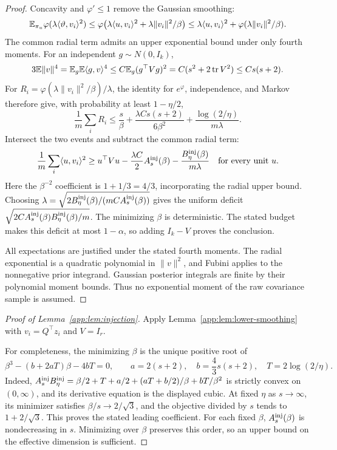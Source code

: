 \documentclass[11pt,a4paper]{article}
\theoremstyle{definition}\newtheorem{definition}[theorem]{Definition}
\theoremstyle{remark}\newtheorem{remark}[theorem]{Remark}
\numberwithin{equation}{section}
\newcommand{\norm}[1]{\lVert#1\rVert}\newcommand{\ip}[2]{\langle#1,#2\rangle}
\DeclareMathOperator{\tr}{tr}\DeclareMathOperator{\rank}{rank}
\begin{document}
\begin{proof}
Concavity and $\varphi'\le1$ remove the Gaussian smoothing:
\[
 \E_{\pi_u}\varphi(\lambda\ip\vartheta{v_i}^2)
 \le\varphi\!\left(\lambda\ip u{v_i}^2+
                       \lambda\norm{v_i}^2/\beta\right)
 \le\lambda\ip u{v_i}^2+
                       \varphi(\lambda\norm{v_i}^2/\beta).
\]
The common radial term admits an upper exponential bound under only
fourth moments. For an independent $g\sim N(0,I_k)$,
\[
 3\E\norm v^4=\E_g\E\ip gv^4
 \le C\E_g(g^\top Vg)^2
 =C(s^2+2\tr V^2)\le Cs(s+2).
\]
For $R_i=\varphi(\lambda\norm{v_i}^2/\beta)/\lambda$, the identity for
$e^\varphi$, independence, and Markov therefore give, with probability
at least $1-\eta/2$,
\[
 \frac1m\sum_iR_i
 \le\frac s\beta+\frac{\lambda C s(s+2)}{6\beta^2}
                          +\frac{\log(2/\eta)}{m\lambda}.
\]
Intersect the two events and subtract the common radial term:
\[
 \frac1m\sum_i\ip u{v_i}^2
 \ge u^\top Vu-\frac{\lambda C}{2}A_s^{\rm inj}(\beta)
                  -\frac{B_\eta^{\rm inj}(\beta)}{m\lambda}
 \quad\text{for every unit }u.
\]
Here the $\beta^{-2}$ coefficient is $1+1/3=4/3$, incorporating the
radial upper bound. Choosing
$\lambda=\sqrt{2B_\eta^{\rm inj}(\beta)/(mCA_s^{\rm inj}(\beta))}$ gives the uniform
deficit $\sqrt{2CA_s^{\rm inj}(\beta)B_\eta^{\rm inj}(\beta)/m}$.
The minimizing $\beta$ is deterministic. The stated budget makes this
deficit at most $1-\alpha$, so adding $I_k-V$ proves the conclusion.

All expectations are justified under the stated fourth moments.
The radial exponential is a quadratic polynomial in $\norm v^2$,
and Fubini applies to the nonnegative prior integrand. Gaussian posterior
integrals are finite by their polynomial moment bounds. Thus no
exponential moment of the raw covariance sample is assumed.
\end{proof}

\begin{proof}[Proof of Lemma~\ref{app:lem:injection}]
\label{proof:injection}
Apply Lemma~\ref{app:lem:lower-smoothing} with
$v_i=Q^\top z_i$ and $V=I_r$.

For completeness, the minimizing $\beta$ is the unique positive root of
\begin{equation}\label{app:eq:injection-cubic}
 \beta^3-(b+2aT)\beta-4bT=0,\qquad
 a=2(s+2),\quad b=\frac43s(s+2),\quad T=2\log(2/\eta).
\end{equation}
Indeed,
$A_s^{\rm inj}B_\eta^{\rm inj}=\beta/2+T+a/2+(aT+b/2)/\beta+bT/\beta^2$
is strictly convex on $(0,\infty)$, and its derivative equation is
the displayed cubic. At fixed $\eta$ as $s\to\infty$, its minimizer
satisfies $\beta/s\to2/\sqrt3$, and the objective divided by $s$
tends to $1+2/\sqrt3$. This proves the stated leading coefficient.
For each fixed $\beta$, $A_s^{\rm inj}(\beta)$ is nondecreasing in $s$.
Minimizing over $\beta$ preserves this order, so an upper bound
on the effective dimension is sufficient.
\end{proof}
\end{document}
